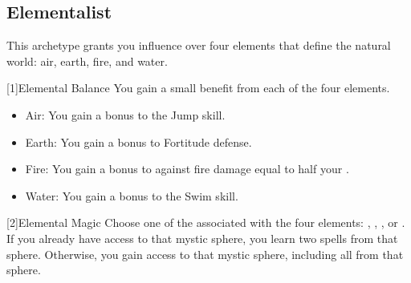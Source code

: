     \subsection{Elementalist}\label{Elementalist}
        This archetype grants you influence over four elements that define the natural world: air, earth, fire, and water.

        [1]{Elemental Balance} You gain a small benefit from each of the four elements.
        \begin{itemize}
            \item Air: You gain a  bonus to the Jump skill.
            \item Earth: You gain a  bonus to Fortitude defense.
            \item Fire: You gain a bonus to  against fire damage equal to half your .
            \item Water: You gain a  bonus to the Swim skill.
        \end{itemize}

        [2]{Elemental Magic} Choose one of the  associated with the four elements: , , , or .
        If you already have access to that mystic sphere, you learn two spells from that sphere.
        Otherwise, you gain access to that mystic sphere, including all  from that sphere.

